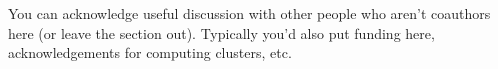 You can acknowledge useful discussion with other people who aren't coauthors here (or leave the section out).
Typically you'd also put funding here, acknowledgements for computing clusters, etc.

